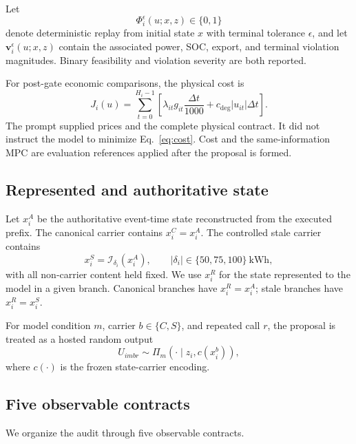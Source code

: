 \documentclass[11pt]{article}
\begin{document}
Let
\begin{equation}
 \Phi_i^{\epsilon}(u;x,z)\in\{0,1\}
 \label{eq:feasibility-map}
\end{equation}
denote deterministic replay from initial state $x$ with terminal tolerance $\epsilon$, and let
$\mathbf v_i^{\epsilon}(u;x,z)$ contain the associated power, SOC, export, and terminal violation
magnitudes. Binary feasibility and violation severity are both reported.

For post-gate economic comparisons, the physical cost is
\begin{equation}
 J_i(u)=\sum_{t=0}^{H_i-1}\left[
 \lambda_{it}g_{it}\frac{\Delta t}{1000}
 +c_{\mathrm{deg}}|u_{it}|\Delta t\right].
 \label{eq:cost}
\end{equation}
The prompt supplied prices and the complete physical contract. It did not instruct the model to
minimize Eq.~\eqref{eq:cost}. Cost and the same-information MPC are evaluation references applied
after the proposal is formed.

\subsection{Represented and authoritative state}

Let $x_i^A$ be the authoritative event-time state reconstructed from the executed prefix. The
canonical carrier contains $x_i^C=x_i^A$. The controlled stale carrier contains
\begin{equation}
 x_i^S=\mathcal I_{\delta_i}(x_i^A),
 \qquad |\delta_i|\in\{50,75,100\}\ \mathrm{kWh},
 \label{eq:intervention}
\end{equation}
with all non-carrier content held fixed. We use $x_i^R$ for the state represented to the model in
a given branch. Canonical branches have $x_i^R=x_i^A$; stale branches have $x_i^R=x_i^S$.

For model condition $m$, carrier $b\in\{C,S\}$, and repeated call $r$, the proposal is treated as
a hosted random output
\begin{equation}
 U_{imbr}\sim\Pi_m(\cdot\mid z_i,c(x_i^b)),
 \label{eq:model-output}
\end{equation}
where $c(\cdot)$ is the frozen state-carrier encoding.

\subsection{Five observable contracts}

We organize the audit through five observable contracts.
\end{document}
